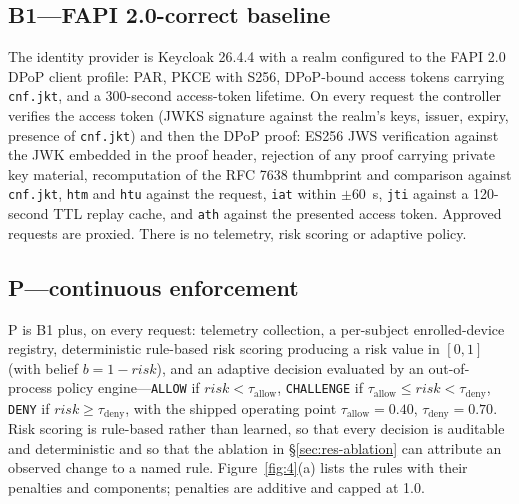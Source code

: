 \subsection{B1---FAPI 2.0-correct baseline}

The identity provider is Keycloak 26.4.4 with a realm configured to the FAPI 2.0 DPoP client profile: PAR, PKCE with S256, DPoP-bound access tokens carrying \texttt{cnf.jkt}, and a 300-second access-token lifetime. On every request the controller verifies the access token (JWKS signature against the realm's keys, issuer, expiry, presence of \texttt{cnf.jkt}) and then the DPoP proof: ES256 JWS verification against the JWK embedded in the proof header, rejection of any proof carrying private key material, recomputation of the RFC 7638 thumbprint and comparison against \texttt{cnf.jkt}, \texttt{htm} and \texttt{htu} against the request, \texttt{iat} within $\pm$60~s, \texttt{jti} against a 120-second TTL replay cache, and \texttt{ath} against the presented access token. Approved requests are proxied. There is no telemetry, risk scoring or adaptive policy.

\subsection{P---continuous enforcement}
\label{sec:system-p}

P is B1 plus, on every request: telemetry collection, a per-subject enrolled-device registry, deterministic rule-based risk scoring producing a risk value in $[0, 1]$ (with belief $b = 1 - \mathit{risk}$), and an adaptive decision evaluated by an out-of-process policy engine---\texttt{ALLOW} if $\mathit{risk} < \tau_{\mathrm{allow}}$, \texttt{CHALLENGE} if $\tau_{\mathrm{allow}} \leq \mathit{risk} < \tau_{\mathrm{deny}}$, \texttt{DENY} if $\mathit{risk} \geq \tau_{\mathrm{deny}}$, with the shipped operating point $\tau_{\mathrm{allow}} = 0.40$, $\tau_{\mathrm{deny}} = 0.70$. Risk scoring is rule-based rather than learned, so that every decision is auditable and deterministic and so that the ablation in \S\ref{sec:res-ablation} can attribute an observed change to a named rule. Figure~\ref{fig:4}(a) lists the rules with their penalties and components; penalties are additive and capped at 1.0.

